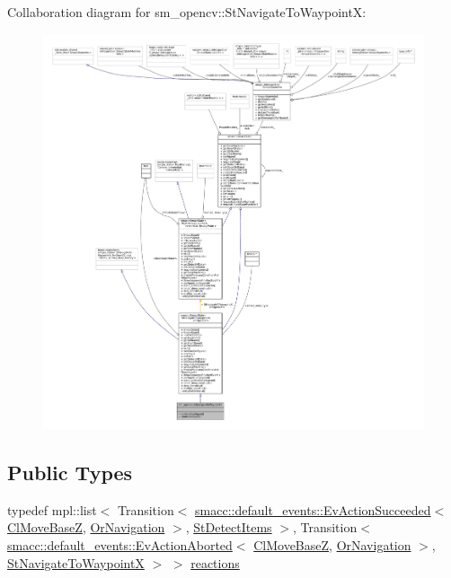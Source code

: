 Collaboration diagram for sm\+\_\+opencv\+:\+:St\+Navigate\+To\+WaypointX\+:
\nopagebreak
\begin{figure}[H]
\begin{center}
\leavevmode
\includegraphics[width=350pt]{structsm__opencv_1_1StNavigateToWaypointX__coll__graph}
\end{center}
\end{figure}
\subsection*{Public Types}
\begin{DoxyCompactItemize}
\item 
typedef mpl\+::list$<$ Transition$<$ \hyperlink{structsmacc_1_1default__events_1_1EvActionSucceeded}{smacc\+::default\+\_\+events\+::\+Ev\+Action\+Succeeded}$<$ \hyperlink{classcl__move__base__z_1_1ClMoveBaseZ}{Cl\+Move\+BaseZ}, \hyperlink{classsm__opencv_1_1OrNavigation}{Or\+Navigation} $>$, \hyperlink{structsm__opencv_1_1StDetectItems}{St\+Detect\+Items} $>$, Transition$<$ \hyperlink{structsmacc_1_1default__events_1_1EvActionAborted}{smacc\+::default\+\_\+events\+::\+Ev\+Action\+Aborted}$<$ \hyperlink{classcl__move__base__z_1_1ClMoveBaseZ}{Cl\+Move\+BaseZ}, \hyperlink{classsm__opencv_1_1OrNavigation}{Or\+Navigation} $>$, \hyperlink{structsm__opencv_1_1StNavigateToWaypointX}{St\+Navigate\+To\+WaypointX} $>$ $>$ \hyperlink{structsm__opencv_1_1StNavigateToWaypointX_ae17d020f304fbaa258896d70d9ada928}{reactions}
\end{DoxyCompactItemize}
